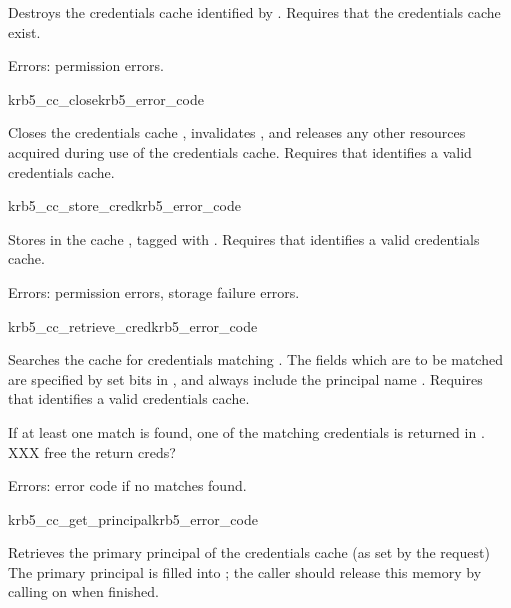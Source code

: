 Destroys the credentials cache identified by .
Requires that the credentials cache exist.

Errors:  permission errors.

\begin{funcdecl}{krb5_cc_close}{krb5_error_code}{\funcinout}
\end{funcdecl}

Closes the credentials cache , invalidates ,
and releases any other resources acquired during use of the credentials cache.
Requires that  identifies a valid credentials cache.


\begin{funcdecl}{krb5_cc_store_cred}{krb5_error_code}{\funcin}
\end{funcdecl}

Stores  in the cache , tagged with
.
Requires that  identifies a valid credentials cache.

Errors: permission errors, storage failure errors.

\begin{funcdecl}{krb5_cc_retrieve_cred}{krb5_error_code}{\funcin}
\funcout
{}
\end{funcdecl}

Searches the cache  for credentials matching
.  The fields which are to be matched are specified by
set bits in , and always include the principal
name .
Requires that  identifies a valid credentials cache.

If at least one match is found, one of the matching credentials is
returned in . XXX free the return creds?

Errors: error code if no matches found.

\begin{funcdecl}{krb5_cc_get_principal}{krb5_error_code}{\funcin}
\end{funcdecl}

Retrieves the primary principal of the credentials cache (as
set by the  request)
The primary principal is filled into ; the caller
should release this memory by calling  on
 when finished.

